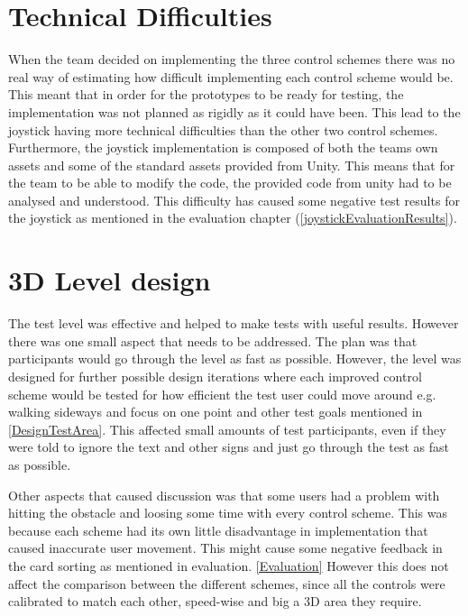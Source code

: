 \section*{Technical Difficulties}
When the team decided on implementing the three control schemes there was no real way of estimating how difficult implementing each control scheme would be. This meant that in order for the prototypes to be ready for testing, the implementation was not planned as rigidly as it could have been. This lead to the joystick having more technical difficulties than the other two control schemes. Furthermore, the joystick implementation is composed of both the teams own assets and some of the standard assets provided from Unity. This means that for the team to be able to modify the code, the provided code from unity had to be analysed and understood. This difficulty has caused some negative test results for the joystick as mentioned in the evaluation chapter (\ref{joystickEvaluationResults}). 

\section*{3D Level design}
The test level was effective and helped to make tests with useful results. However there was one small aspect that needs to be addressed. The plan was that participants would go through the level as fast as possible. However, the level was designed for further possible design iterations where each improved control scheme would be tested for how efficient the test user could move around e.g. walking sideways and focus on one point and other test goals mentioned in \ref {DesignTestArea}. This affected small amounts of test participants, even if they were told to ignore the text and other signs and just go through the test as fast as possible. 

Other aspects that caused discussion was that some users had a problem with hitting the obstacle and loosing some time with every control scheme. This was because each scheme had its own little disadvantage in implementation that caused inaccurate user movement. 
This might cause some negative feedback in the card sorting as mentioned in evaluation. \ref{Evaluation} However this does not affect the comparison between the different schemes, since all the controls were calibrated to match each other, speed-wise and big a 3D area they require. 

